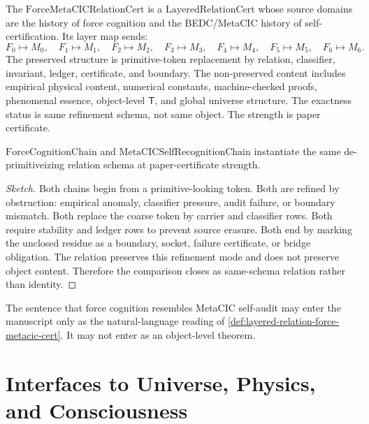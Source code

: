 \begin{definition}
\label{def:layered-relation-force-metacic-cert}
The $\mathrm{ForceMetaCICRelationCert}$ is a $\mathrm{LayeredRelationCert}$ whose source domains are the history of force cognition and the BEDC/MetaCIC history of self-certification. Its layer map sends:
$$
F_0\mapsto M_0,\quad
F_1\mapsto M_1,\quad
F_2\mapsto M_2,\quad
F_3\mapsto M_3,\quad
F_4\mapsto M_4,\quad
F_5\mapsto M_5,\quad
F_6\mapsto M_6.
$$
The preserved structure is primitive-token replacement by relation, classifier, invariant, ledger, certificate, and boundary. The non-preserved content includes empirical physical content, numerical constants, machine-checked proofs, phenomenal essence, object-level $\mathsf{T}$, and global universe structure. The exactness status is same refinement schema, not same object. The strength is paper certificate.
\end{definition}

\begin{theorem}
\label{thm:layered-relation-force-metacic-same-schema}
$\mathrm{ForceCognitionChain}$ and $\mathrm{MetaCICSelfRecognitionChain}$ instantiate the same de-primitiveizing relation schema at paper-certificate strength.
\end{theorem}
\begin{proof}[Sketch]
Both chains begin from a primitive-looking token. Both are refined by obstruction: empirical anomaly, classifier pressure, audit failure, or boundary mismatch. Both replace the coarse token by carrier and classifier rows. Both require stability and ledger rows to prevent source erasure. Both end by marking the unclosed residue as a boundary, socket, failure certificate, or bridge obligation. The relation preserves this refinement mode and does not preserve object content. Therefore the comparison closes as same-schema relation rather than identity.
\end{proof}

\begin{corollary}
\label{cor:layered-relation-analogy-as-certificate}
The sentence that force cognition resembles MetaCIC self-audit may enter the manuscript only as the natural-language reading of \autoref{def:layered-relation-force-metacic-cert}. It may not enter as an object-level theorem.
\end{corollary}

\section{Interfaces to Universe, Physics, and Consciousness}
\label{sec:layered-relation-interfaces}

